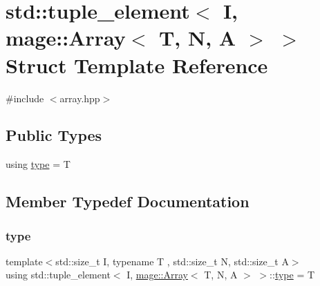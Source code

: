 \hypertarget{structstd_1_1tuple__element_3_01_i_00_01mage_1_1_array_3_01_t_00_01_n_00_01_a_01_4_01_4}{}\section{std\+:\+:tuple\+\_\+element$<$ I, mage\+:\+:Array$<$ T, N, A $>$ $>$ Struct Template Reference}
\label{structstd_1_1tuple__element_3_01_i_00_01mage_1_1_array_3_01_t_00_01_n_00_01_a_01_4_01_4}


{\ttfamily \#include $<$array.\+hpp$>$}

\subsection*{Public Types}
\begin{DoxyCompactItemize}
\item 
using \mbox{\hyperlink{structstd_1_1tuple__element_3_01_i_00_01mage_1_1_array_3_01_t_00_01_n_00_01_a_01_4_01_4_a6e43e3b0b102494c884ca2fd73274140}{type}} = T
\end{DoxyCompactItemize}


\subsection{Member Typedef Documentation}
\mbox{\label{structstd_1_1tuple__element_3_01_i_00_01mage_1_1_array_3_01_t_00_01_n_00_01_a_01_4_01_4_a6e43e3b0b102494c884ca2fd73274140}} 
\subsubsection{\texorpdfstring{type}{type}}
{\footnotesize\ttfamily template$<$std\+::size\+\_\+t I, typename T , std\+::size\+\_\+t N, std\+::size\+\_\+t A$>$ \\
using std\+::tuple\+\_\+element$<$ I, \mbox{\hyperlink{structmage_1_1_array}{mage\+::\+Array}}$<$ T, N, A $>$ $>$\+::\mbox{\hyperlink{structstd_1_1tuple__element_3_01_i_00_01mage_1_1_array_3_01_t_00_01_n_00_01_a_01_4_01_4_a6e43e3b0b102494c884ca2fd73274140}{type}} =  T}


